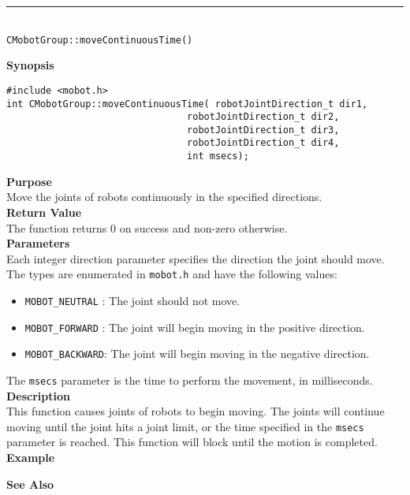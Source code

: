 \noindent
\vspace{5pt}
\rule{4.5in}{0.015in}\\
\noindent
{\LARGE \texttt{CMobotGroup::moveContinuousTime()}}\\
{}

\noindent
{\bf Synopsis}
\begin{verbatim}
#include <mobot.h>
int CMobotGroup::moveContinuousTime( robotJointDirection_t dir1, 
                                robotJointDirection_t dir2, 
                                robotJointDirection_t dir3, 
                                robotJointDirection_t dir4, 
                                int msecs);
\end{verbatim}

\noindent
{\bf Purpose}\\
Move the joints of robots continuously in the specified directions.\\

\noindent
{\bf Return Value}\\
The function returns 0 on success and non-zero otherwise.\\

\noindent
{\bf Parameters}\\
Each integer direction parameter specifies the direction the joint should move. The types
are enumerated in \texttt{mobot.h} and have the following values:
\begin{itemize}
\item \texttt{MOBOT\_NEUTRAL} : The joint should not move.
\item \texttt{MOBOT\_FORWARD} : The joint will begin moving in the positive direction.
\item \texttt{MOBOT\_BACKWARD}: The joint will begin moving in the negative direction.
\end{itemize}
The \texttt{msecs} parameter is the time to perform the movement, in milliseconds.
\\

\noindent
{\bf Description}\\
This function causes joints of robots to begin moving. The joints will continue moving
until the joint hits a joint limit, or the time specified in the \texttt{msecs} parameter
is reached. This function will block until the motion is completed.\\

\noindent
{\bf Example}\\
\noindent

\noindent
{\bf See Also}\\

